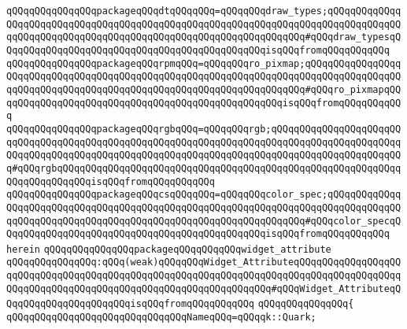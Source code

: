 \verb|qQQqqQQqqQQqqQQqpackageqQQqdtqQQqqQQq=qQQqqQQqdraw_types;qQQqqQQqqQQqqQQqqQQqqQQqqQQqqQQqqQQqqQQqqQQqqQQqqQQqqQQqqQQqqQQqqQQqqQQqqQQqqQQqqQQqqQQqqQQqqQQqqQQqqQQqqQQqqQQqqQQqqQQqqQQqqQQqqQQqqQQq#qQQqdraw_typesqQQqqQQqqQQqqQQqqQQqqQQqqQQqqQQqqQQqqQQqqQQqqQQqisqQQqfromqQQqqQQqqQQq|\newline
\verb|qQQqqQQqqQQqqQQqpackageqQQqrpmqQQq=qQQqqQQqro_pixmap;qQQqqQQqqQQqqQQqqQQqqQQqqQQqqQQqqQQqqQQqqQQqqQQqqQQqqQQqqQQqqQQqqQQqqQQqqQQqqQQqqQQqqQQqqQQqqQQqqQQqqQQqqQQqqQQqqQQqqQQqqQQqqQQqqQQqqQQqqQQq#qQQqro_pixmapqQQqqQQqqQQqqQQqqQQqqQQqqQQqqQQqqQQqqQQqqQQqqQQqqQQqisqQQqfromqQQqqQQqqQQq|\newline
\verb|qQQqqQQqqQQqqQQqpackageqQQqrgbqQQq=qQQqqQQqrgb;qQQqqQQqqQQqqQQqqQQqqQQqqQQqqQQqqQQqqQQqqQQqqQQqqQQqqQQqqQQqqQQqqQQqqQQqqQQqqQQqqQQqqQQqqQQqqQQqqQQqqQQqqQQqqQQqqQQqqQQqqQQqqQQqqQQqqQQqqQQqqQQqqQQqqQQqqQQqqQQqqQQq#qQQqrgbqQQqqQQqqQQqqQQqqQQqqQQqqQQqqQQqqQQqqQQqqQQqqQQqqQQqqQQqqQQqqQQqqQQqqQQqqQQqisqQQqfromqQQqqQQqqQQq|\newline
\verb|qQQqqQQqqQQqqQQqpackageqQQqcsqQQqqQQq=qQQqqQQqcolor_spec;qQQqqQQqqQQqqQQqqQQqqQQqqQQqqQQqqQQqqQQqqQQqqQQqqQQqqQQqqQQqqQQqqQQqqQQqqQQqqQQqqQQqqQQqqQQqqQQqqQQqqQQqqQQqqQQqqQQqqQQqqQQqqQQqqQQqqQQq#qQQqcolor_specqQQqqQQqqQQqqQQqqQQqqQQqqQQqqQQqqQQqqQQqqQQqqQQqisqQQqfromqQQqqQQqqQQq|\newline
\verb|herein|\newline
\newline
\verb|qQQqqQQqqQQqqQQqpackageqQQqqQQqqQQqwidget_attribute|\newline
\verb|qQQqqQQqqQQqqQQq:qQQq(weak)qQQqqQQqWidget_AttributeqQQqqQQqqQQqqQQqqQQqqQQqqQQqqQQqqQQqqQQqqQQqqQQqqQQqqQQqqQQqqQQqqQQqqQQqqQQqqQQqqQQqqQQqqQQqqQQqqQQqqQQqqQQqqQQqqQQqqQQqqQQqqQQqqQQqqQQq#qQQqWidget_AttributeqQQqqQQqqQQqqQQqqQQqqQQqisqQQqfromqQQqqQQqqQQq|\newline
\verb|qQQqqQQqqQQqqQQq{|\newline
\verb|qQQqqQQqqQQqqQQqqQQqqQQqqQQqqQQqNameqQQq=qQQqqk::Quark;|\newline
